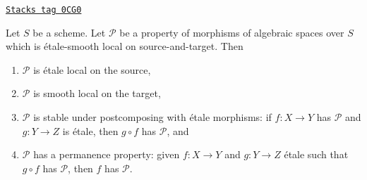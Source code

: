 \begin{lemma}
\label{spaces-descent-lemma-etale-smooth-local-source-target-implies}
\href{https://stacks.math.columbia.edu/tag/0CG0}{\texttt{Stacks tag 0CG0}}

Let $S$ be a scheme.
Let $\mathcal{P}$ be a property of morphisms of algebraic spaces over $S$
which is \'etale-smooth local on source-and-target. Then
\begin{enumerate}
\item $\mathcal{P}$ is \'etale local on the source,
\item $\mathcal{P}$ is smooth local on the target,
\item $\mathcal{P}$ is stable under postcomposing with \'etale morphisms:
if $f : X \to Y$ has $\mathcal{P}$ and $g : Y \to Z$ is \'etale, then
$g \circ f$ has $\mathcal{P}$, and
\item $\mathcal{P}$ has a permanence property: given $f : X \to Y$ and
$g : Y \to Z$ \'etale such that $g \circ f$ has $\mathcal{P}$, then
$f$ has $\mathcal{P}$.
\end{enumerate}
\end{lemma}

